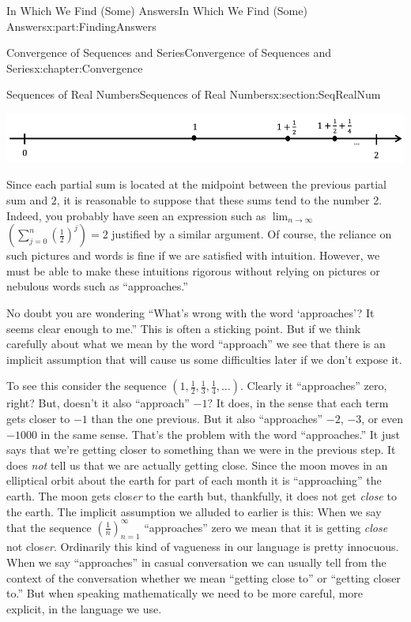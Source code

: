 \documentclass[oneside,10pt,]{book}
\numberwithin{equation}{section}
\begin{document}
\begin{partptx}{In Which We Find (Some) Answers}{}{In Which We Find (Some) Answers}{}{}{x:part:FindingAnswers}
\begin{chapterptx}{Convergence of Sequences and Series}{}{Convergence of Sequences and Series}{}{}{x:chapter:Convergence}
\begin{sectionptx}{Sequences of Real Numbers}{}{Sequences of Real Numbers}{}{}{x:section:SeqRealNum}
\begin{image}{0.08}{0.84}{0.08}
\includegraphics[width=\linewidth]{images/NumberLine.png}
\end{image}%
Since each partial sum is located at the midpoint between the previous partial sum and \(2\), it is reasonable to suppose that these sums tend to the number 2. Indeed, you probably have seen an expression such as \(\lim_{n\rightarrow\infty}\) \(\left(\sum_{j=0}^n\left(\frac{1}{2}\right)^j\right)=2\) justified by a similar argument. Of course, the reliance on such pictures and words is fine if we are satisfied with intuition. However, we must be able to make these intuitions rigorous without relying on pictures or nebulous words such as ``approaches.''%
\par
No doubt you are wondering ``What's wrong with the word `approaches'? It seems clear enough to me.'' This is often a sticking point. But if we think carefully about what we mean by the word ``approach'' we see that there is an implicit assumption that will cause us some difficulties later if we don't expose it.%
\par
To see this consider the sequence \(\left(1,\frac12,\frac13,\frac14,\ldots\right)\). Clearly it ``approaches'' zero, right? But, doesn't it also ``approach'' \(-1?\) It does, in the sense that each term gets closer to \(-1\) than the one previous. But it also ``approaches'' \(-2\), \(-3\), or even \(-1000\) in the same sense. That's the problem with the word ``approaches.'' It just says that we're getting closer to something than we were in the previous step. It does \emph{not} tell us that we are actually getting close. Since the moon moves in an elliptical orbit about the earth for part of each month it is ``approaching'' the earth. The moon gets clos\emph{er} to the earth but, thankfully, it does not get \emph{close} to the earth. The implicit assumption we alluded to earlier is this: When we say that the sequence \(\left(\frac1n\right)_{n=1}^\infty\) ``approaches'' zero we mean that it is getting \emph{close} not clos\emph{er}. Ordinarily this kind of vagueness in our language is pretty innocuous. When we say ``approaches'' in casual conversation we can usually tell from the context of the conversation whether we mean ``getting close to'' or ``getting closer to.'' But when speaking mathematically we need to be more careful, more explicit, in the language we use.%
\par

\end{sectionptx}
\end{chapterptx}
\end{partptx}
\end{document}
